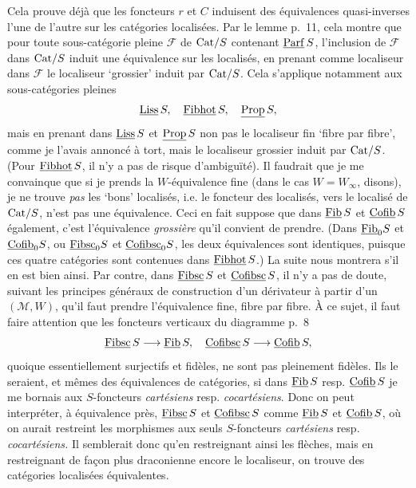 Cela prouve déjà que les foncteurs $r$ et $C$ induisent des équivalences quasi-inverses l'une de l'autre sur les catégories localisées. Par le lemme p.~11, cela montre que pour toute sous-catégorie pleine $\mathcal{F}$ de $\mathrm{Cat}/S$ contenant $\underline{\mathrm{Parf}}\,S$, l'inclusion de $\mathcal{F}$ dans $\mathrm{Cat}/S$ induit une
équivalence sur les localisés, en prenant comme localiseur dans $\mathcal{F}$ le localiseur `grossier' induit par $\mathrm{Cat}/S$. Cela s'applique notamment aux sous-catégories pleines
\[ \underline{\mathrm{Liss}}\,S, \quad \underline{\mathrm{Fibhot}}\,S, \quad \underline{\mathrm{Prop}}\,S, \]
mais en prenant dans $\underline{\mathrm{Liss}}\,S$ et $\underline{\mathrm{Prop}}\,S$ non pas le localiseur fin `fibre par fibre', comme je l'avais annoncé à tort, mais le localiseur grossier induit par $\mathrm{Cat}/S$. (Pour $\underline{\mathrm{Fibhot}}\,S$, il n'y a pas de risque d'ambiguïté). Il faudrait que je me convainque que si je prends la $W$-équivalence fine (dans le cas $W = W_\infty$, disons), je ne trouve \textit{pas} les `bons' localisés, i.e. le foncteur des localisés, vers le localisé de $\mathrm{Cat}/S$, n'est pas une équivalence. Ceci en fait suppose que dans $\underline{\mathrm{Fib}}\,S$ et $\underline{\mathrm{Cofib}}\,S$ également, c'est l'équivalence \textit{grossière}
qu'il convient de prendre. (Dans $\underline{\mathrm{Fib}}_0S$ et $\underline{\mathrm{Cofib}}_0S$, ou $\underline{\mathrm{Fibsc}}_0S$ et $\underline{\mathrm{Cofibsc}}_0S$, les deux équivalences sont identiques, puisque ces quatre catégories sont contenues dans $\underline{\mathrm{Fibhot}}\,S$.) La suite nous montrera s'il en est bien ainsi. Par contre, dans $\underline{\mathrm{Fibsc}}\,S$ et $\underline{\mathrm{Cofibsc}}\,S$, il n'y a pas de doute, suivant les principes généraux de construction d'un dérivateur à partir d'un $(\mathcal{M}, W)$, qu'il faut prendre l'équivalence fine, fibre par fibre. À ce sujet, il faut faire attention que les foncteurs verticaux du diagramme p.~8
\[ \underline{\mathrm{Fibsc}}\,S \longrightarrow \underline{\mathrm{Fib}}\,S, \quad \underline{\mathrm{Cofibsc}}\,S \longrightarrow \underline{\mathrm{Cofib}}\,S, \]
quoique essentiellement surjectifs et fidèles, ne sont pas pleinement fidèles. Ils le seraient, et mêmes des équivalences de catégories, si dans $\underline{\mathrm{Fib}}\,S$ resp. $\underline{\mathrm{Cofib}}\,S$ je me bornais aux $S$-foncteurs \textit{cartésiens} resp. \textit{cocartésiens}. Donc on peut interpréter, à équivalence près, $\underline{\mathrm{Fibsc}}\,S$ et $\underline{\mathrm{Cofibsc}}\,S$ comme $\underline{\mathrm{Fib}}\,S$ et $\underline{\mathrm{Cofib}}\,S$, où on aurait restreint les morphismes aux seuls $S$-foncteurs \textit{cartésiens} resp. \textit{cocartésiens.} Il semblerait donc qu'en restreignant ainsi les flèches, mais en restreignant de façon plus draconienne encore le localiseur, on trouve des catégories localisées équivalentes. %

